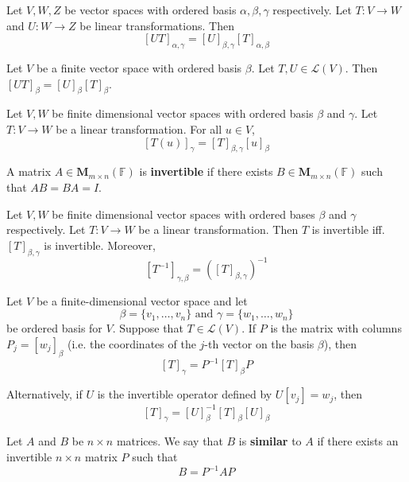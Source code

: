 \begin{theorem}
	Let $V, W, Z$ be vector spaces with ordered basis $\alpha, \beta, \gamma$ respectively. Let $T : V \longrightarrow W$ and $U : W \longrightarrow Z$ be linear transformations. Then
	\[
		[UT]_{\alpha, \gamma} = [U]_{\beta, \gamma} [T]_{\alpha, \beta}
	\]
\end{theorem}

\begin{corollary}
	Let $V$ be a finite vector space with ordered basis $\beta$. Let $T, U \in \mathcal{L}(V)$. Then $[UT]_\beta = [U]_\beta [T]_\beta$.
\end{corollary}

\begin{theorem}
	Let $V, W$ be finite dimensional vector spaces with ordered basis $\beta$ and $\gamma$. Let $T : V \longrightarrow W$ be a linear transformation. For all $u \in V$, 
	\[
		[T(u)]_\gamma = [T]_{\beta,\gamma} [u]_\beta
	\]
\end{theorem}

\begin{definition}
	A matrix $A \in \textbf{M}_{m \times n}(\mathbb{F})$ is \textbf{invertible} if there exists $B \in \textbf{M}_{m \times n}(\mathbb{F})$ such that $AB = BA = I$.
\end{definition}

\begin{theorem}
	Let $V, W$ be finite dimensional vector spaces with ordered bases $\beta$ and $\gamma$ respectively. Let $T : V \longrightarrow W$ be a linear transformation. Then $T$ is invertible iff. $[T]_{\beta,\gamma}$ is invertible. Moreover,
	\[ 
		[T^{-1}]_{\gamma, \beta} = ([T]_{\beta,\gamma})^{-1}
	\]
\end{theorem}

\begin{theorem}
	Let $V$ be a finite-dimensional vector space and let
	\[
		\beta = \{ v_1, \ldots, v_n \} \text{ and } \gamma = \{ w_1, \ldots, w_n \}
	\]
	be ordered basis for $V$. Suppose that $T \in \mathcal{L}(V)$. If $P$ is the matrix with columns $P_j = [w_j]_\beta$ (i.e. the coordinates of the $j$-th vector on the basis $\beta$), then
	\[
		[T]_\gamma = P^{-1} [T]_\beta P
	\]

	Alternatively, if $U$ is the invertible operator defined by $U[v_j] = w_j$, then
	\[
		[T]_\gamma = [U]_\beta^{-1} [T]_\beta [U]_\beta
	\]
\end{theorem}

\begin{definition}
	Let $A$ and $B$ be $n \times n$ matrices. We say that $B$ is \textbf{similar} to $A$ if there exists an invertible $n \times n$ matrix $P$ such that 
	\[
		B = P^{-1} A P
	\]
\end{definition}

